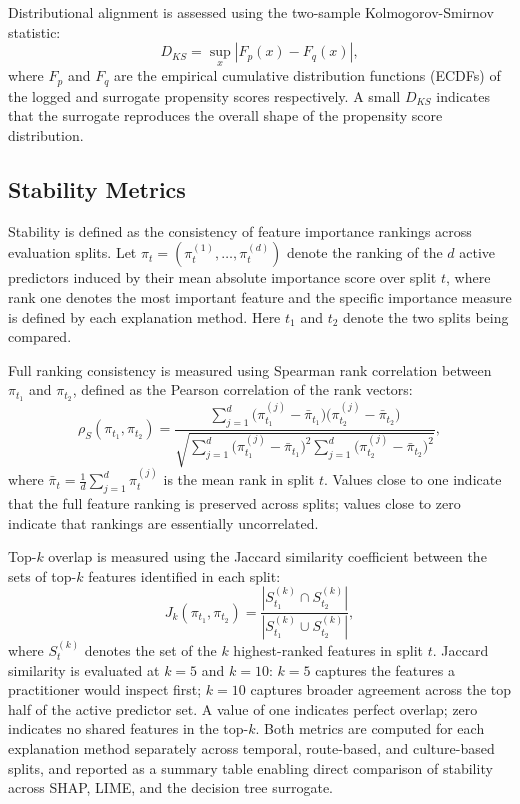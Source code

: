 \documentclass[oneside]{memoir} %
\begin{document}
Distributional alignment is assessed using the two-sample Kolmogorov-Smirnov statistic:
\[
D_{KS} = \sup_{x} \left| F_p(x) - F_q(x) \right|,
\]
where $F_p$ and $F_q$ are the empirical cumulative distribution functions (ECDFs) of the logged and surrogate propensity scores respectively. A small $D_{KS}$ indicates that the surrogate reproduces the overall shape of the propensity score distribution.

\subsection{Stability Metrics}

Stability is defined as the consistency of feature importance rankings across evaluation splits. Let $\pi_t = (\pi_t^{(1)}, \ldots, \pi_t^{(d)})$ denote the ranking of the $d$ active predictors induced by their mean absolute importance score over split $t$, where rank one denotes the most important feature and the specific importance measure is defined by each explanation method. Here $t_1$ and $t_2$ denote the two splits being compared.

Full ranking consistency is measured using Spearman rank correlation between $\pi_{t_1}$ and $\pi_{t_2}$, defined as the Pearson correlation of the rank vectors:
\[
\rho_S(\pi_{t_1}, \pi_{t_2}) =
\frac{\sum_{j=1}^{d}\bigl(\pi_{t_1}^{(j)} - \bar{\pi}_{t_1}\bigr)
\bigl(\pi_{t_2}^{(j)} - \bar{\pi}_{t_2}\bigr)} {\sqrt{\sum_{j=1}^{d}\bigl(\pi_{t_1}^{(j)} - \bar{\pi}_{t_1}\bigr)^2
\sum_{j=1}^{d}\bigl(\pi_{t_2}^{(j)} - \bar{\pi}_{t_2}\bigr)^2}},
\]
where $\bar{\pi}_{t} = \frac{1}{d}\sum_{j=1}^{d}\pi_t^{(j)}$ is the mean rank in split $t$. Values close to one indicate that the full feature ranking is preserved across splits; values close to zero indicate that rankings are essentially uncorrelated.

Top-$k$ overlap is measured using the Jaccard similarity coefficient between the sets of top-$k$ features identified in each split:
\[
J_k(\pi_{t_1}, \pi_{t_2}) = \frac{|S_{t_1}^{(k)} \cap S_{t_2}^{(k)}|}{|S_{t_1}^{(k)} \cup S_{t_2}^{(k)}|},
\]
where $S_t^{(k)}$ denotes the set of the $k$ highest-ranked features in split $t$. Jaccard similarity is evaluated at $k = 5$ and $k = 10$: $k = 5$ captures the features a practitioner would inspect first; $k = 10$ captures broader agreement across the top half of the active predictor set. A value of one indicates perfect overlap; zero indicates no shared features in the top-$k$. Both metrics are computed for each explanation method separately across temporal, route-based, and culture-based splits, and reported as a summary table enabling direct comparison of stability across SHAP, LIME, and the decision tree surrogate.
\end{document}
